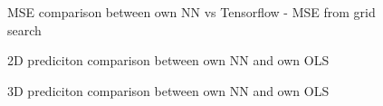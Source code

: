 \documentclass
[twocolumn,
secnumarabic,
nobibnotes,
aps,
prl,
reprint,
groupedaddress,
amsmath,
amssymb
]{revtex4-2}
\begin{document}
\begin{figure}
  \hspace*{-1.5cm}
  \caption{MSE comparison between own NN vs Tensorflow - MSE from grid search \label{fig:own_NN_vs_tf}}
\end{figure}

\begin{figure}
  \caption{2D prediciton comparison between own NN and own OLS \label{fig:2D_preds_NN_vs_OLS}}
\end{figure}

\begin{figure}
  \caption{3D prediciton comparison between own NN and own OLS \label{fig:3D_preds_NN_vs_OLS}}
\end{figure}
\end{document}
